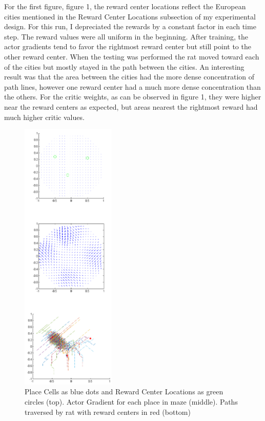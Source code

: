\documentclass[conference]{IEEEtran}
\begin{document}
For the first figure, figure 1, the reward center locations reflect the European cities mentioned in the Reward Center Locations subsection of my experimental design. For this run, I depreciated the rewards by a constant factor in each time step. The reward values were all uniform in the beginning. After training, the actor gradients tend to favor the rightmost reward center but still point to the other reward center. When the testing was performed the rat moved toward each of the cities but mostly stayed in the path between the cities. An interesting result was that the area between the cities had the more dense concentration of path lines, however one reward center had a much more dense concentration than the others. For the critic weights, as can be observed in figure 1, they were higher near the reward centers as expected, but areas nearest the rightmost reward had much higher critic values.

\begin{figure}
\includegraphics[width=0.4\textwidth]{waterMazeRevised2_Figure.png} 
\caption{Place Cells as blue dots and Reward Center Locations as green circles (top). Actor Gradient for each place in maze (middle). Paths traversed by rat with reward centers in red (bottom)}
\end{figure}
\end{document}
